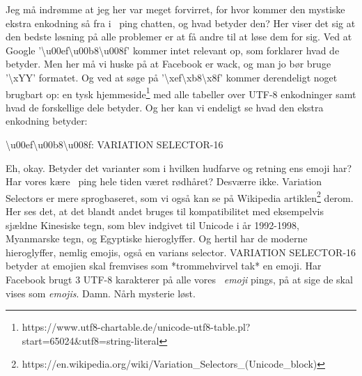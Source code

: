 \documentclass{article}
\newlength\myheight
\newlength\mydepth
\newcommand*\inlinegraphics[1]{%
  \settototalheight\myheight{Xygp}%
  \settodepth\mydepth{Xygp}%
  \raisebox{-\mydepth}{\texttt{[image: \#1]}}%
}
\newcommand{\coffee}[0]{\inlinegraphics{coffee.png}}
\begin{document}
Jeg må indrømme at jeg her var meget forvirret, for hvor kommer den mystiske ekstra enkodning så fra i \coffee\ ping chatten, og hvad betyder den?
Her viser det sig at den bedste løsning på alle problemer er at få andre til at løse dem for sig. Ved at Google '\textbackslash u00ef\textbackslash u00b8\textbackslash u008f' kommer intet relevant op, som forklarer hvad de betyder. Men her må vi huske på at Facebook er wack, og man jo bør bruge '\textbackslash xYY' formatet. Og ved at søge på '\textbackslash xef\textbackslash xb8\textbackslash x8f' kommer derendeligt noget brugbart op: en tysk hjemmeside\footnote{https://www.utf8-chartable.de/unicode-utf8-table.pl?start=65024\&utf8=string-literal} med alle tabeller over UTF-8 enkodninger samt hvad de forskellige dele betyder. Og her kan vi endeligt se hvad den ekstra enkodning betyder:
\begin{center}
	\textbackslash u00ef\textbackslash u00b8\textbackslash u008f: VARIATION SELECTOR-16
\end{center}
Eh, okay. Betyder det varianter som i hvilken hudfarve og retning ens emoji har? Har vores kære \coffee\ ping hele tiden været rødhåret? Desværre ikke. Variation Selectors er mere sprogbaseret, som vi også kan se på Wikipedia artiklen\footnote{https://en.wikipedia.org/wiki/Variation\_Selectors\_(Unicode\_block)} derom. Her ses det, at det blandt andet bruges til kompatibilitet med eksempelvis sjældne Kinesiske tegn, som blev indgivet til Unicode i år 1992-1998, Myanmarske tegn, og Egyptiske hieroglyffer. Og hertil har de moderne hieroglyffer, nemlig emojis, også en varians selector. VARIATION SELECTOR-16 betyder at emojien skal fremvises som *trommehvirvel tak* en emoji.
Har Facebook brugt 3 UTF-8 karakterer på alle vores \coffee\ \emph{emoji} pings, på at sige de skal vises som \emph{emojis}. Damn.
Nårh mysterie løst.
\end{document}
